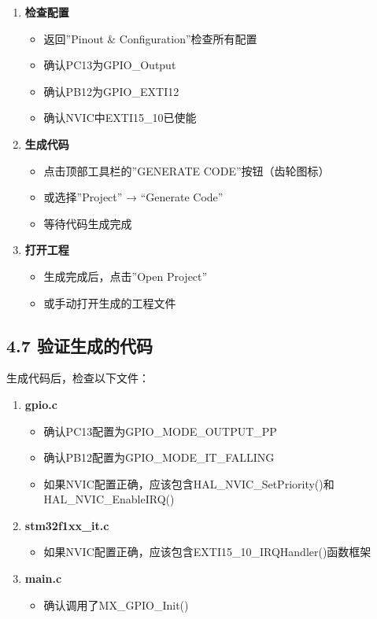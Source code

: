\documentclass[
  chinese,
  UTF8,
  oneside,
  openany]{ctexbook}
\providecommand{\tightlist}{%
  \setlength{\itemsep}{0pt}\setlength{\parskip}{0pt}}
\begin{document}
\begin{enumerate}
\def\labelenumi{\arabic{enumi}.}
\tightlist
\item
  \textbf{检查配置}

  \begin{itemize}
  \tightlist
  \item
    返回''Pinout \& Configuration''检查所有配置
  \item
    确认PC13为GPIO\_Output
  \item
    确认PB12为GPIO\_EXTI12
  \item
    确认NVIC中EXTI15\_10已使能
  \end{itemize}
\item
  \textbf{生成代码}

  \begin{itemize}
  \tightlist
  \item
    点击顶部工具栏的''GENERATE CODE''按钮（齿轮图标）
  \item
    或选择''Project'' → ``Generate Code''
  \item
    等待代码生成完成
  \end{itemize}
\item
  \textbf{打开工程}

  \begin{itemize}
  \tightlist
  \item
    生成完成后，点击''Open Project''
  \item
    或手动打开生成的工程文件
  \end{itemize}
\end{enumerate}

\subsection{4.7
验证生成的代码}\label{ux9a8cux8bc1ux751fux6210ux7684ux4ee3ux7801}

生成代码后，检查以下文件：

\begin{enumerate}
\def\labelenumi{\arabic{enumi}.}
\tightlist
\item
  \textbf{gpio.c}

  \begin{itemize}
  \tightlist
  \item
    确认PC13配置为GPIO\_MODE\_OUTPUT\_PP
  \item
    确认PB12配置为GPIO\_MODE\_IT\_FALLING
  \item
    如果NVIC配置正确，应该包含HAL\_NVIC\_SetPriority()和HAL\_NVIC\_EnableIRQ()
  \end{itemize}
\item
  \textbf{stm32f1xx\_it.c}

  \begin{itemize}
  \tightlist
  \item
    如果NVIC配置正确，应该包含EXTI15\_10\_IRQHandler()函数框架
  \end{itemize}
\item
  \textbf{main.c}

  \begin{itemize}
  \tightlist
  \item
    确认调用了MX\_GPIO\_Init()
  \end{itemize}
\end{enumerate}
\end{document}
